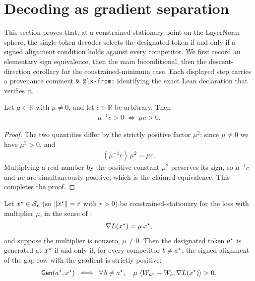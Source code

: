 \section{Decoding as gradient separation}
\label{sec:decode-iff}

This section proves that, at a constrained stationary point on the LayerNorm sphere, the
single-token decoder selects the designated token if and only if a signed alignment
condition holds against every competitor. We first record an elementary sign equivalence,
then the main biconditional, then the descent-direction corollary for the
constrained-minimum case. Each displayed step carries a provenance comment
\verb|% @lx-from:| identifying the exact Lean declaration that verifies it.

\begin{lemma}
\label{lem:sign_equiv}
Let $\mu \in \mathbb{R}$ with $\mu \ne 0$, and let $c \in \mathbb{R}$ be arbitrary. Then %
\begin{align*}
\mu^{-1} c > 0 \;\iff\; \mu c > 0.
\end{align*}
\end{lemma}

\begin{proof}
The two quantities differ by the strictly positive factor $\mu^{2}$: since $\mu \ne 0$ we
have $\mu^{2} > 0$, and
\begin{align*}
(\mu^{-1} c)\,\mu^{2} = \mu c.
\end{align*}
Multiplying a real number by the positive constant $\mu^{2}$ preserves its sign, so
$\mu^{-1} c$ and $\mu c$ are simultaneously positive, which is the claimed equivalence. This
completes the proof.
\end{proof}

\begin{theorem}
\label{thm:main}
Let $x^{\star} \in \mathcal{S}_r$ (so $\left\| x^{\star} \right\| = r$ with $r > 0$) be constrained-stationary for
the loss with multiplier $\mu$, in the sense of :
\begin{align*}
\nabla L(x^{\star}) = \mu\,x^{\star},
\end{align*}
and suppose the multiplier is nonzero, $\mu \ne 0$. Then the designated token $a^{\star}$ is
generated at $x^{\star}$ if and only if, for every competitor $b \ne a^{\star}$, the signed
alignment of the gap row with the gradient is strictly positive:
\begin{align*}
\mathsf{Gen}(a^{\star}, x^{\star})
\;\iff\;
\forall\, b \ne a^{\star},\quad \mu\,\left\langle W_{a^{\star}} - W_{b}, \nabla L(x^{\star}) \right\rangle > 0.
\end{align*}
\end{theorem}

